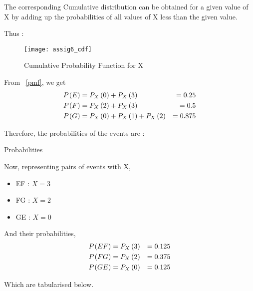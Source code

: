 \documentclass[journal,12pt,twocolumn]{IEEEtran}
\begin{document}
	The corresponding Cumulative distribution can be obtained for a given value of X by adding up the probabilities of all values of X less than the given value.
	
	Thus :
	
	\begin{figure}[h!]
	
		\caption{Cumulative Probability Function for X}
		
		\texttt{[image: assig6\_cdf]}
		
			\label{cdf}
	
	\end{figure}

	
	From ~\ref{pmf}, we get
	\begin{align}
		P_{}\left(E\right) &= P_{X}\left(0\right) + P_{X}\left(3\right) &= 0.25\\
		P_{}\left(F\right) &= P_{X}\left(2\right) + P_{X}\left(3\right) &= 0.5\\
		P_{}\left(G\right) &= P_{X}\left(0\right) + P_{X}\left(1\right) + P_{X}\left(2\right) &= 0.875
	\end{align}
	
	Therefore, the probabilities of the events are :
	
	\begin{table}[h!]
	
		\caption{Probabilities}
		
		
		
			\label{table}
	
	\end{table}
	
	Now, representing pairs of events with X,
	
	\begin{itemize}
	
		\item EF : $X = 3$
		
		\item FG : $X = 2$
		
		\item GE : $X = 0$
		
	\end{itemize}
	
	And their probabilities,
	\begin{align}
		P_{}\left(EF\right) &= P_{X}\left(3\right) &= 0.125 \\
		P_{}\left(FG\right) &= P_{X}\left(2\right) &= 0.375 \\
		P_{}\left(GE\right) &= P_{X}\left(0\right) &= 0.125
	\end{align}
	
	Which are tabularised below.
	
\end{document}
